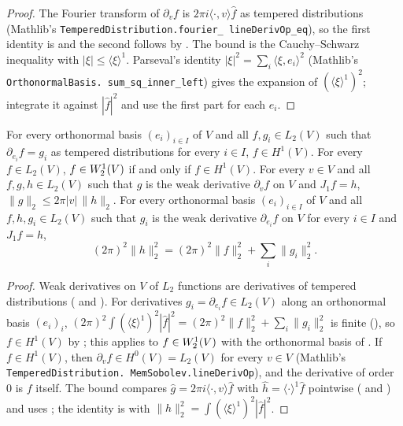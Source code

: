 \begin{proof}
\leanok
The Fourier transform of $\partial_v f$ is $2 \pi i \langle \cdot, v \rangle \widehat f$ as
tempered distributions (Mathlib's \texttt{TemperedDistribution.\allowbreak fourier\_\allowbreak
lineDerivOp\_\allowbreak eq}), so the first identity is  and the
second follows by . The bound is the Cauchy--Schwarz inequality with
$|\xi| \leq \langle \xi \rangle^1$. Parseval's identity
$|\xi|^2 = \sum_i \langle \xi, e_i \rangle^2$ (Mathlib's \texttt{OrthonormalBasis.\allowbreak
sum\_\allowbreak sq\_\allowbreak inner\_\allowbreak left}) gives the expansion of
$(\langle \xi \rangle^1)^2$; integrate it against $|\widehat f|^2$ and use the first part for
each $e_i$.
\end{proof}

\begin{theorem}[$\Sob{1}{2} = H^1$]
\label{thm:sobolev-one-two}
\leanok
{}
For every orthonormal basis $(e_i)_{i \in I}$ of $V$ and all $f, g_i \in L_2(V)$ such that
$\partial_{e_i} f = g_i$ as tempered distributions for every $i \in I$, $f \in H^1(V)$. For every
$f \in L_2(V)$, $f \in W^{1}_{2}(V)$ if and only if $f \in H^1(V)$. For every
$v \in V$ and all $f, g, h \in L_2(V)$ such that $g$ is the weak derivative $\partial_v f$ on $V$
and $J_1 f = h$, $\|g\|_2 \leq 2 \pi |v| \, \|h\|_2$. For every orthonormal basis
$(e_i)_{i \in I}$ of $V$ and all $f, h, g_i \in L_2(V)$ such that $g_i$ is the weak derivative
$\partial_{e_i} f$ on $V$ for every $i \in I$ and $J_1 f = h$,
\[
  (2\pi)^2 \|h\|_2^2 = (2\pi)^2 \|f\|_2^2 + \sum_i \|g_i\|_2^2 .
\]
\end{theorem}

\begin{proof}
\leanok
Weak derivatives on $V$ of $L_2$ functions are derivatives of tempered distributions
( and ). For derivatives
$g_i = \partial_{e_i} f \in L_2(V)$ along an orthonormal basis $(e_i)_i$,
$(2\pi)^2 \int (\langle \xi \rangle^1)^2 |\widehat f|^2 = (2\pi)^2 \|f\|_2^2 +
\sum_i \|g_i\|_2^2$ is finite (), so $f \in H^1(V)$ by
; this applies to $f \in W^{1}_{2}(V)$ with the orthonormal basis
of . If $f \in H^1(V)$, then $\partial_v f \in
H^0(V) = L_2(V)$ for every $v \in V$ (Mathlib's \texttt{TemperedDistribution.\allowbreak
MemSobolev.\allowbreak lineDerivOp}), and the derivative of order $0$ is $f$ itself. The bound
compares $\widehat g = 2 \pi i \langle \cdot, v \rangle \widehat f$ with
$\widehat h = \langle \cdot \rangle^1 \widehat f$ pointwise
( and ) and uses
; the identity is  with
$\|h\|_2^2 = \int (\langle \xi \rangle^1)^2 |\widehat f|^2$.
\end{proof}

